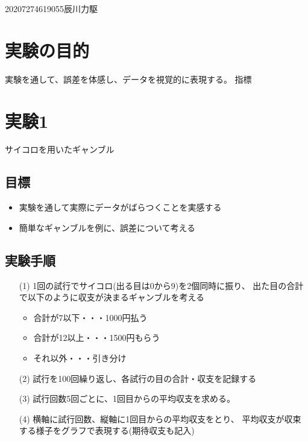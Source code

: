 \documentclass[12pt]{jarticle}
\begin{document}
{2020}{7}{27}{4619055}{辰川力駆}


\section{実験の目的}
実験を通して、誤差を体感し、データを視覚的に表現する。
指標

\section{実験1}
サイコロを用いたギャンブル

\subsection{目標}
\begin{itemize}
    \item 実験を通して実際にデータがばらつくことを実感する
    \item 簡単なギャンブルを例に、誤差について考える
\end{itemize}
\subsection{実験手順}
\begin{itemize}
    \item[(1)] 1回の試行でサイコロ(出る目は0から9)を2個同時に振り、
          出た目の合計で以下のように収支が決まるギャンブルを考える
          \begin{itemize}
              \item 合計が7以下・・・1000円払う
              \item 合計が12以上・・・1500円もらう
              \item それ以外・・・引き分け
          \end{itemize}
    \item[(2)] 試行を100回繰り返し、各試行の目の合計・収支を記録する
    \item[(3)] 試行回数5回ごとに、1回目からの平均収支を求める。
    \item[(4)] 横軸に試行回数、縦軸に1回目からの平均収支をとり、
          平均収支が収束する様子をグラフで表現する(期待収支も記入)
\end{itemize}
\end{document}
